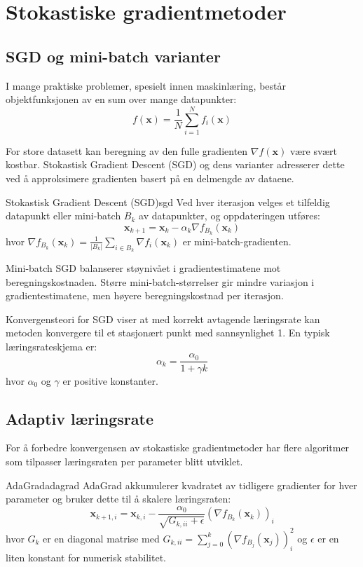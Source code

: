 \section{Stokastiske gradientmetoder}
\label{sec:stochastic_gradient_methods}

\subsection{SGD og mini-batch varianter}
\label{subsec:sgd_variants}

I mange praktiske problemer, spesielt innen maskinlæring, består objektfunksjonen av en sum over mange datapunkter:
\[
	f(\symbf{x}) = \frac{1}{N} \sum_{i=1}^{N} f_i(\symbf{x})
\]

For store datasett kan beregning av den fulle gradienten \(\nabla f(\symbf{x})\) være svært kostbar. Stokastisk Gradient Descent (SGD) og dens varianter adresserer dette ved å approksimere gradienten basert på en delmengde av dataene.

\begin{definition}{Stokastisk Gradient Descent (SGD)}{sgd}
	Ved hver iterasjon velges et tilfeldig datapunkt eller mini-batch \(B_k\) av datapunkter, og oppdateringen utføres:
	\[
		\symbf{x}_{k+1} = \symbf{x}_k - \alpha_k \nabla f_{B_k}(\symbf{x}_k)
	\]
	hvor \(\nabla f_{B_k}(\symbf{x}_k) = \frac{1}{|B_k|} \sum_{i \in B_k} \nabla f_i(\symbf{x}_k)\) er mini-batch-gradienten.
\end{definition}

Mini-batch SGD balanserer støynivået i gradientestimatene mot beregningskostnaden. Større mini-batch-størrelser gir mindre variasjon i gradientestimatene, men høyere beregningskostnad per iterasjon.

Konvergensteori for SGD viser at med korrekt avtagende læringsrate kan metoden konvergere til et stasjonært punkt med sannsynlighet 1. En typisk læringsrateskjema er:
\[
	\alpha_k = \frac{\alpha_0}{1 + \gamma k}
\]
hvor \(\alpha_0\) og \(\gamma\) er positive konstanter.

\subsection{Adaptiv læringsrate}
\label{subsec:adaptive_learning_rate}

For å forbedre konvergensen av stokastiske gradientmetoder har flere algoritmer som tilpasser læringsraten per parameter blitt utviklet.

\begin{definition}{AdaGrad}{adagrad}
	AdaGrad akkumulerer kvadratet av tidligere gradienter for hver parameter og bruker dette til å skalere læringsraten:
	\[
		\symbf{x}_{k+1,i} = \symbf{x}_{k,i} - \frac{\alpha_0}{\sqrt{G_{k,ii} + \epsilon}} (\nabla f_{B_k}(\symbf{x}_k))_i
	\]
	hvor \(G_k\) er en diagonal matrise med \(G_{k,ii} = \sum_{j=0}^{k} (\nabla f_{B_j}(\symbf{x}_j))_i^2\) og \(\epsilon\) er en liten konstant for numerisk stabilitet.
\end{definition}

